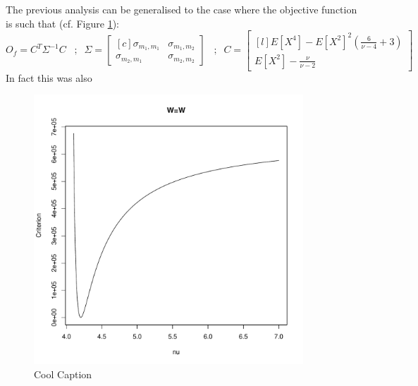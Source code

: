 The previous analysis can be generalised to the case where the objective function is such that (cf. Figure \ref{ConcavitySPW}):
\begin{equation*}
    O_f = C^T \Sigma^{-1} C \; \; \; ; \; \;
        \Sigma=
    \begin{bmatrix}[c]
        \sigma_{m_1,m_1}    & \sigma_{m_1,m_2} \\
        \sigma_{m_2,m_1}    & \sigma_{m_2,m_2}
    \end{bmatrix}
    \;\;\; ; \; \; C = 
    \begin{bmatrix}[l]
        E[X^4]-E[X^2]^2(\frac{6}{\nu-4}+3)  \\
        E[X^2]-\frac{\nu}{\nu-2}
    \end{bmatrix}
\end{equation*}
In fact this was also

\begin{figure}
    \centering
    \includegraphics[width=0.9\textwidth]{ConcavityS&PW.pdf}
    \caption{Cool Caption}
    \label{ConcavitySPW}
\end{figure}
